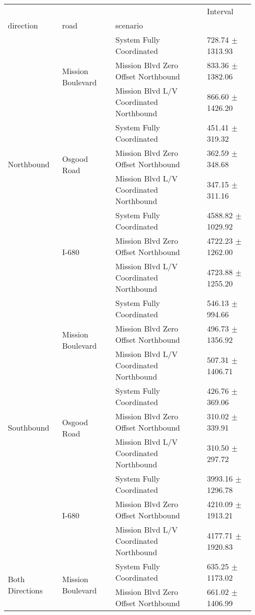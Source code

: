 \begin{tabular}{llll}
\toprule
 &  &  & Interval \\
direction & road & scenario &  \\
\midrule
\multirow[t]{9}{*}{Northbound} & \multirow[t]{3}{*}{Mission Boulevard} & System Fully Coordinated & 728.74 $\pm$ 1313.93 \\
 &  & Mission Blvd Zero Offset Northbound & 833.36 $\pm$ 1382.06 \\
 &  & Mission Blvd L/V Coordinated Northbound & 866.60 $\pm$ 1426.20 \\
 & \multirow[t]{3}{*}{Osgood Road} & System Fully Coordinated & 451.41 $\pm$ 319.32 \\
 &  & Mission Blvd Zero Offset Northbound & 362.59 $\pm$ 348.68 \\
 &  & Mission Blvd L/V Coordinated Northbound & 347.15 $\pm$ 311.16 \\
 & \multirow[t]{3}{*}{I-680} & System Fully Coordinated & 4588.82 $\pm$ 1029.92 \\
 &  & Mission Blvd Zero Offset Northbound & 4722.23 $\pm$ 1262.00 \\
 &  & Mission Blvd L/V Coordinated Northbound & 4723.88 $\pm$ 1255.20 \\
\multirow[t]{9}{*}{Southbound} & \multirow[t]{3}{*}{Mission Boulevard} & System Fully Coordinated & 546.13 $\pm$ 994.66 \\
 &  & Mission Blvd Zero Offset Northbound & 496.73 $\pm$ 1356.92 \\
 &  & Mission Blvd L/V Coordinated Northbound & 507.31 $\pm$ 1406.71 \\
 & \multirow[t]{3}{*}{Osgood Road} & System Fully Coordinated & 426.76 $\pm$ 369.06 \\
 &  & Mission Blvd Zero Offset Northbound & 310.02 $\pm$ 339.91 \\
 &  & Mission Blvd L/V Coordinated Northbound & 310.50 $\pm$ 297.72 \\
 & \multirow[t]{3}{*}{I-680} & System Fully Coordinated & 3993.16 $\pm$ 1296.78 \\
 &  & Mission Blvd Zero Offset Northbound & 4210.09 $\pm$ 1913.21 \\
 &  & Mission Blvd L/V Coordinated Northbound & 4177.71 $\pm$ 1920.83 \\
\multirow[t]{9}{*}{Both Directions} & \multirow[t]{3}{*}{Mission Boulevard} & System Fully Coordinated & 635.25 $\pm$ 1173.02 \\
 &  & Mission Blvd Zero Offset Northbound & 661.02 $\pm$ 1406.99 \\

\end{tabular}
